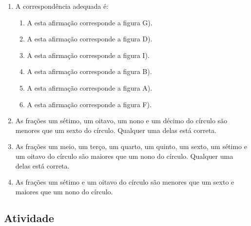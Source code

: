 \documentclass[a4paper,12pt,twoside]{book}
\begin{document}
\begin{resposta*}[breakable]{}{}  
\begin{enumerate} [\quad a)] %
    \item       A correspondência adequada é:      
\begin{enumerate} [\quad I)] %
        \item           A esta afirmação corresponde a figura G).
        \item           A esta afirmação corresponde a figura D).
        \item           A esta afirmação corresponde a figura I).
        \item           A esta afirmação corresponde a figura B).
        \item           A esta afirmação corresponde a figura A).
        \item           A esta afirmação corresponde a figura F).
\end{enumerate} %

    \item       As frações um sétimo, um oitavo, um nono e um décimo do círculo são menores que um sexto do círculo. Qualquer uma delas está correta.
    \item       As frações um meio, um terço, um quarto, um quinto, um sexto, um sétimo e um oitavo do círculo são maiores que um nono do círculo. Qualquer uma delas está correta.
    \item       As frações um sétimo e um oitavo do círculo são menores que um sexto e maiores que um nono do círculo.
\end{enumerate} %
  
\end{resposta*}




\subsection{Atividade}
\end{document}
